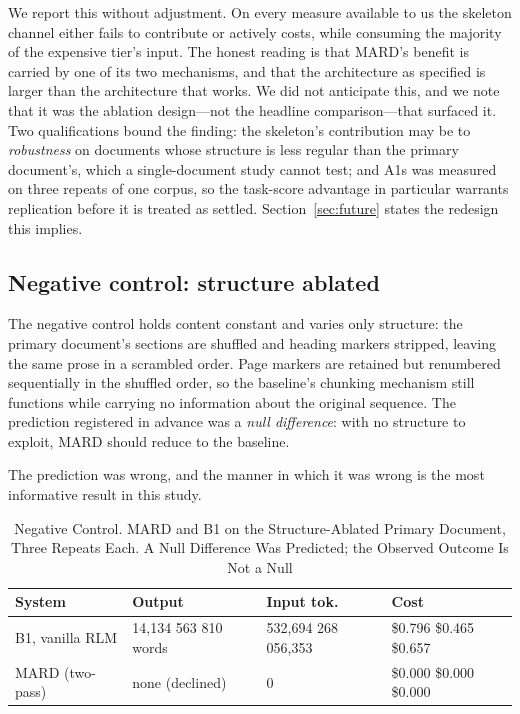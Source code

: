 \documentclass[conference]{IEEEtran}
\begin{document}
We report this without adjustment. On every measure available to us the
skeleton channel either fails to contribute or actively costs, while
consuming the majority of the expensive tier's input. The honest reading is
that MARD's benefit is carried by one of its two mechanisms, and that the
architecture as specified is larger than the architecture that works. We did
not anticipate this, and we note that it was the ablation design---not the
headline comparison---that surfaced it. Two qualifications bound the finding:
the skeleton's contribution may be to \emph{robustness} on documents whose
structure is less regular than the primary document's, which a single-document
study cannot test; and A1s was measured on three repeats of one corpus, so
the task-score advantage in particular warrants replication before it is
treated as settled. Section~\ref{sec:future} states the redesign this implies.

\subsection{Negative control: structure ablated}
\label{sec:negcontrol}
The negative control holds content constant and varies only structure: the
primary document's sections are shuffled and heading markers stripped, leaving
the same prose in a scrambled order. Page markers are retained but renumbered
sequentially in the shuffled order, so the baseline's chunking mechanism still
functions while carrying no information about the original sequence. The
prediction registered in advance was a \emph{null difference}: with no
structure to exploit, MARD should reduce to the baseline.

The prediction was wrong, and the manner in which it was wrong is the most
informative result in this study.

\begin{table}[!t]
\caption{Negative Control. MARD and B1 on the Structure-Ablated Primary
Document, Three Repeats Each. A Null Difference Was Predicted; the Observed
Outcome Is Not a Null}
\label{tab:negcontrol}
\centering
\renewcommand{\arraystretch}{1.2}
\begin{tabular}{@{}p{2.3cm}R{1.5cm}R{1.7cm}R{1.6cm}@{}}
\toprule
\textbf{System} & \textbf{Output} & \textbf{Input tok.} & \textbf{Cost} \\
\midrule
B1, vanilla RLM & 14{,}134 563 810 words & 532{,}694 268 056{,}353 & \$0.796 \newline \$0.465 \newline \$0.657 \\
MARD (two-pass) & none \newline (declined) & 0   & \$0.000 \newline \$0.000 \newline \$0.000 \\
\bottomrule
\end{tabular}
\end{table}
\end{document}
